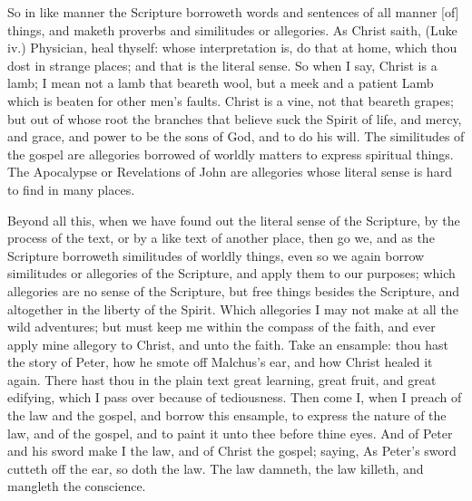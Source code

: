So in like manner the Scripture borroweth words and 
sentences of all manner [of] things, and maketh proverbs 
and similitudes or allegories. As Christ saith, (Luke iv.) 
Physician, heal thyself: whose interpretation is, do that at 
home, which thou dost in strange places; and that is the 
literal sense. So when I say, Christ is a lamb; I mean 
not a lamb that beareth wool, but a meek and a patient 
Lamb which is beaten for other men's faults. Christ is a 
vine, not that beareth grapes; but out of whose root the 
branches that believe suck the Spirit of life, and mercy, 
and grace, and power to be the sons of God, and to do 
his will. The similitudes of the gospel are allegories
borrowed of worldly matters to express spiritual things.
The Apocalypse or Revelations of John are allegories 
whose literal sense is hard to find in many places. 

Beyond all this, when we have found out the literal sense 
of the Scripture, by the process of the text, or by a like 
text of another place, then go we, and as the Scripture 
borroweth similitudes of worldly things, even so we again 
borrow similitudes or allegories of the Scripture, and apply 
them to our purposes; which allegories are no sense of
the Scripture, but free things besides the Scripture, and
altogether in the liberty of the Spirit. Which allegories
I may not make at all the wild adventures; but must 
keep me within the compass of the faith, and ever apply 
mine allegory to Christ, and unto the faith. Take an ensample:
thou hast the story of Peter, how he smote off 
Malchus's ear, and how Christ healed it again. There 
hast thou in the plain text great learning, great fruit, and 
great edifying, which I pass over because of tediousness. 
Then come I, when I preach of the law and the gospel, 
and borrow this ensample, to express the nature of the 
law, and of the gospel, and to paint it unto thee before 
thine eyes. And of Peter and his sword make I the law, 
and of Christ the gospel; saying, As Peter's sword cutteth 
off the ear, so doth the law. The law damneth, the law 
killeth, and mangleth the conscience. 

